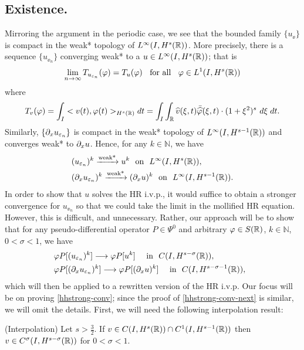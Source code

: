 \subsection{Existence.}
Mirroring the argument in the periodic case, we see that the bounded
family $\{u_\ee\}$ is compact in the weak* topology of $L^\infty(I,
H^{s}(\mathbb{R}))$. More precisely, there is a sequence  $\{ u_{\ee_n} \}$
converging weak* to a $ u\in L^{\infty}(I, H^s(\mathbb{R}))$; that is 
%
\begin{equation*}
\label{hhweak-conv}
\lim_{n\to \infty} T_{u_{\varepsilon_n}}(\varphi)  =  T_u (\varphi) 
\; \;		
\ \text{for all} \  \;\;  \varphi \in L^1(I, H^{s}(\mathbb{R}))
\end{equation*}
where
\begin{equation}
T_v(\varphi) = \int_I <v (t), \varphi (t)>_{H^s(\mathbb{R})} dt  = \int_I
\int_{\mathbb{R}}
\widehat{v}(\xi, t) \bar{\widehat{\varphi}} (\xi, t) \cdot (1 +
\xi^2)^s \ d \xi \; dt.
\end{equation}
%
Similarly, $\left\{ \partial_x u_{\varepsilon_n} \right\}$ is compact in the
weak* topology of $L^\infty(I, H^{s-1}(\mathbb{R}))$ and converges weak*
to $\partial_x u$. Hence, for any $k \in \mathbb{N}$, we have
\begin{align}
\label{base-weak}
& (u_{\varepsilon_n})^k \xrightarrow{\text{weak*}} u^k \ \
\text{on} \ \
L^\infty(I, H^s(\mathbb{R})),
\\
\label{base-weak-2}
& (\partial_x u_{\varepsilon_n})^k \xrightarrow{\text{weak*}} (\partial_x u)^k
\ \ \text{on} \ \
L^\infty(I, H^{s-1}(\mathbb{R})). 
\end{align}
In order to show that $u$ solves the HR i.v.p., it would
suffice to obtain a stronger convergence for  $u_{\ee_n}$ so that 
we could take the limit in the mollified HR equation. However,
this is difficult, and unnecessary. Rather, our approach will be to
show that for any pseudo-differential operator
$P \in \Psi^0$ and arbitrary $\varphi \in S(\mathbb{R})$, $k \in
\mathbb{N}$, $0< \sigma < 1$, we have
%
%
\begin{align}
\label{hhstrong-conv}
& \varphi P [(u_{\ee_n})^k] \longrightarrow \varphi P [u^k]  
\quad
\ \text{in} \  \,\,   C(I, H^{s-\sigma}(\rr)), \ \,
\\
\label{hhstrong-conv-next}
& \varphi P [(\p_x u_{\ee_n})^k] \longrightarrow \varphi P
[(\p_x u)^k]  
\quad
\ \text{in} \  \,\,   C(I, H^{s-\sigma -1}(\rr)), \ \ 
\end{align}
%
which will then be applied to a rewritten version of the HR
i.v.p. Our focus will be on proving \eqref{hhstrong-conv}; since the proof of
\eqref{hhstrong-conv-next} is similar, we will omit the
details. First, we will need the following
interpolation result:
%
%
%
%
\begin{lemma}
\label{hhinterpolation-lem}
(Interpolation)     Let  $s > \frac{3}{2}$.
If $v \in C(I, H^s(\mathbb{R})) \cap C^1(I, H^{s-1}(\mathbb{R}))$
then $v \in C^\sigma (I, H^{s- \sigma}(\mathbb{R}))$ for  $0 < \sigma < 1$.
\end{lemma}
%
